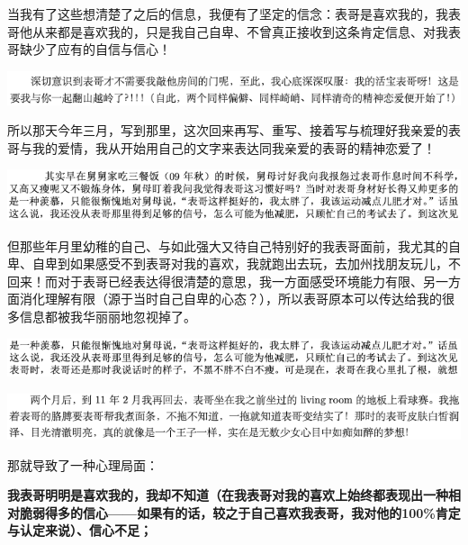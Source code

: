 \documentclass[9pt, b5paper]{article}
\begin{document}
当我有了这些想清楚了之后的信息，我便有了坚定的信念：表哥是喜欢我的，我表哥他从来都是喜欢我的，只是我自己自卑、不曾真正接收到这条肯定信息、对我表哥缺少了应有的自信与信心！

\begin{center}
\includegraphics[width=.9\linewidth]{./pic/backups_plans_20210426_162149.png}
\end{center}

所以那天今年三月，写到那里，这次回来再写、重写、接着写与梳理好我亲爱的表哥与我的爱情，我从开始用自己的文字来表达同我亲爱的表哥的精神恋爱了！

\begin{center}
\includegraphics[width=.9\linewidth]{./pic/backups_plans_20210426_162643.png}
\end{center}

但那些年月里幼稚的自己、与如此强大又待自己特别好的我表哥面前，我尤其的自卑、自卑到如果感受不到表哥对我的喜欢，我就跑出去玩，去加州找朋友玩儿，不回来！而对于表哥已经表达得很清楚的意思，我一方面感受环境能力有限、另一方面消化理解有限（源于当时自己自卑的心态？），所以表哥原本可以传达给我的很多信息都被我华丽丽地忽视掉了。

\begin{center}
\includegraphics[width=.9\linewidth]{./pic/backups_plans_20210426_163310.png}
\end{center}

\begin{center}
\includegraphics[width=.9\linewidth]{./pic/backups_plans_20210426_163417.png}
\end{center}

那就导致了一种心理局面：

\textbf{我表哥明明是喜欢我的，我却不知道（在我表哥对我的喜欢上始终都表现出一种相对脆弱得多的信心——如果有的话，较之于自己喜欢我表哥，我对他的100\%肯定与认定来说）、信心不足；}
\end{document}
